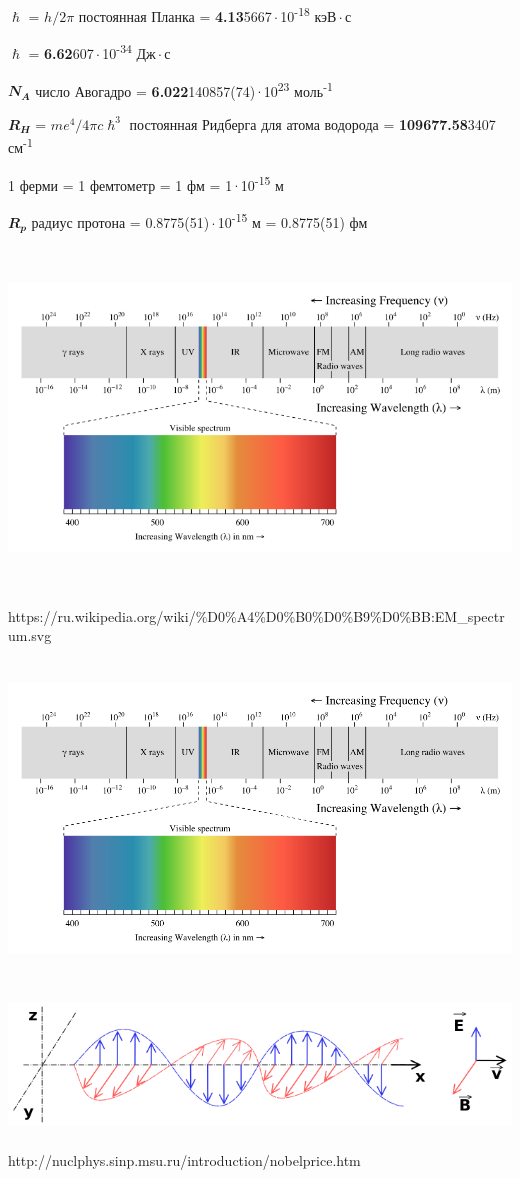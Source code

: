 \documentclass[a4paper,14pt, openany, twoside, draft]{extbook} %
\begin{document}
$\mathbfit{\hslash}$ = $h/2\pi$ постоянная Планка = \textbf{4.13}5667\,$\cdot$\,10\textsuperscript{-18} кэВ\,$\cdot$\,с

$\mathbfit{\hslash}$ = \textbf{6.62}607\,$\cdot$\,10\textsuperscript{-34} Дж\,$\cdot$\,с

$\mathbfit{N_A}$  число Авогадро = \textbf{6.022}140857(74)\,$\cdot$\,10\textsuperscript{23} моль\textsuperscript{-1}

$\mathbfit{R_H}$ = $me^4/4\pi c\hslash^3$ постоянная Ридберга для атома водорода = \textbf{109677.58}3407 см\textsuperscript{-1}

1 ферми = 1 фемтометр = 1 фм = 1\,$\cdot$\,10\textsuperscript{-15} м

$\mathbfit{R_p}$ радиус протона = 0.8775(51)\,$\cdot$\,10\textsuperscript{-15} м = 0.8775(51) фм

\clearpage{}
 \includegraphics[width=16.866cm,height=9.022cm]{EMRad-img001.png}

https://ru.wikipedia.org/wiki/\%D0\%A4\%D0\%B0\%D0\%B9\%D0\%BB:EM\_spectrum.svg

 \includegraphics[width=15.665cm,height=8.382cm]{EMRad-img002.png}

 \includegraphics[width=14.713cm,height=3.627cm]{EMRad-img003.png}

http://nuclphys.sinp.msu.ru/introduction/nobelprice.htm
\end{document}
